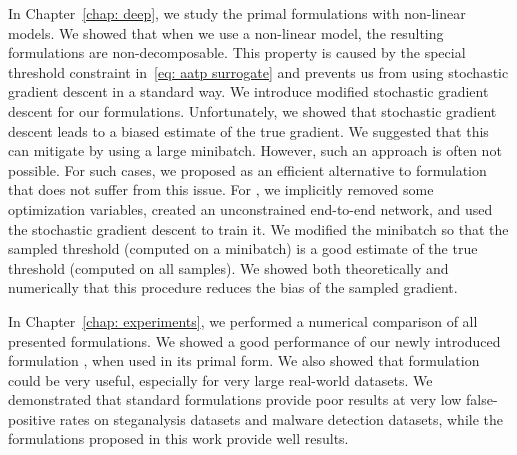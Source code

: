 In Chapter~\ref{chap: deep}, we study the primal formulations with non-linear models. We showed that when we use a non-linear model, the resulting formulations are non-decomposable. This property is caused by the special threshold constraint in~\eqref{eq: aatp surrogate} and prevents us from using stochastic gradient descent in a standard way. We introduce modified stochastic gradient descent for our formulations. Unfortunately, we showed that stochastic gradient descent leads to a biased estimate of the true gradient. We suggested that this can mitigate by using a large minibatch. However, such an approach is often not possible. For such cases, we proposed \DeepTopPush as an efficient alternative to \TopPush formulation that does not suffer from this issue. For \DeepTopPush, we implicitly removed some optimization variables, created an unconstrained end-to-end network, and used the stochastic gradient descent to train it. We modified the minibatch so that the sampled threshold (computed on a minibatch) is a good estimate of the true threshold (computed on all samples). We showed both theoretically and numerically that this procedure reduces the bias of the sampled gradient.

In Chapter~\ref{chap: experiments}, we performed a numerical comparison of all presented formulations. We showed a good performance of our newly introduced formulation \PatMatNP, when used in its primal form. We also showed that \DeepTopPush formulation could be very useful, especially for very large real-world datasets. We demonstrated that standard formulations provide poor results at very low false-positive rates on steganalysis datasets and malware detection datasets, while the formulations proposed in this work provide well results.
